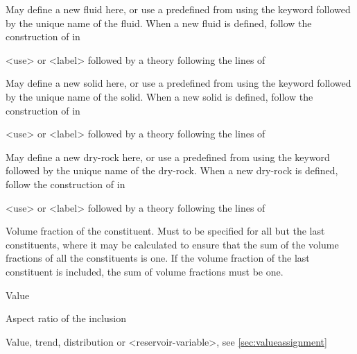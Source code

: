 {
 \slist
   \item \Description May define a new fluid here, or use a predefined  from  using the keyword  followed by the unique name of the fluid. When a new fluid is defined, follow the construction of  in 
   \item \Argument <use> or <label> followed by a theory following the lines of 
   \item \Default
 \elist

 \slist
   \item \Description May define a new solid here, or use a predefined  from  using the keyword  followed by the unique name of the solid. When a new solid is defined, follow the construction of  in 
   \item \Argument <use> or <label> followed by a theory following the lines of 
   \item \Default
 \elist

 \slist
   \item \Description  May define a new dry-rock here, or use a predefined  from  using the keyword  followed by the unique name of the dry-rock. When a new dry-rock is defined, follow the construction of  in 
   \item \Argument <use> or <label> followed by a theory following the lines of 
   \item \Default
 \elist

 \slist
   \item \Description Volume fraction of the constituent. Must to be specified for all but the last constituents, where it may be calculated to ensure that the sum of the volume fractions of all the constituents is one. If the volume fraction of the last constituent is included, the sum of volume fractions must be one. 
   \item \Argument Value
   \item \Default
 \elist

 \slist
   \item \Description Aspect ratio of the inclusion
   \item \Argument Value, trend, distribution or <reservoir-variable>, see \autoref{sec:valueassignment}
   \item \Default
 \elist

}
